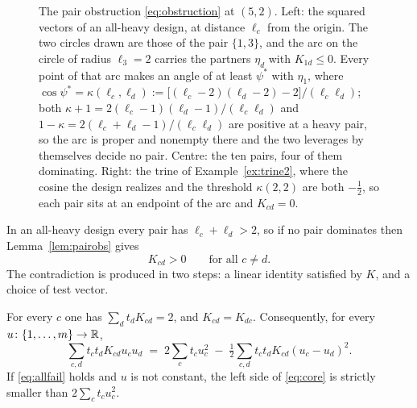 \begin{figure}[ht]
  \centering
  
  \caption{The pair obstruction \eqref{eq:obstruction} at $(5,2)$.  Left: the
  squared vectors of an all-heavy design, at distance $\ell_c$ from the
  origin.  The two circles drawn are those of the pair $\{1,3\}$, and the arc
  on the circle of radius $\ell_3=2$ carries the partners $\eta_d$ with
  $K_{1d}\le0$.  Every point of that arc makes an angle of at
  least $\psi^{*}$ with $\eta_1$, where $\cos\psi^{*}=\kappa(\ell_c,\ell_d):=
  \bigl[(\ell_c-2)(\ell_d-2)-2\bigr]/(\ell_c\ell_d)$; both
  $\kappa+1=2(\ell_c-1)(\ell_d-1)/(\ell_c\ell_d)$ and
  $1-\kappa=2(\ell_c+\ell_d-1)/(\ell_c\ell_d)$ are positive at a heavy pair,
  so the arc is proper and nonempty there and the two leverages by themselves
  decide no pair.  Centre: the ten pairs, four of them dominating.  Right: the
  trine of Example~\ref{ex:trine2}, where the cosine the design realizes and
  the threshold $\kappa(2,2)$ are both $-\tfrac12$, so each pair sits at an
  endpoint of the arc and $K_{cd}=0$.}
  \label{fig:obstruction}
\end{figure}

In an all-heavy design every pair has $\ell_c+\ell_d>2$, so if no pair
dominates then Lemma~\ref{lem:pairobs} gives
\begin{equation}\label{eq:allfail}
  K_{cd}>0\qquad\text{for all }c\ne d .
\end{equation}
The contradiction is produced in two steps: a linear identity satisfied
by $K$, and a choice of test vector.

\begin{lemma}\label{lem:rowsum}
For every $c$ one has $\sum_d t_dK_{cd}=2$, and $K_{cd}=K_{dc}$.
Consequently, for every $u\colon\{1,\dots,m\}\to\mathbb{R}$,
\begin{equation}\label{eq:core}
  \sum_{c,d}t_ct_dK_{cd}u_cu_d
  \;=\;2\sum_c t_cu_c^2
      \;-\;\tfrac12\sum_{c,d}t_ct_dK_{cd}(u_c-u_d)^2 .
\end{equation}
If \eqref{eq:allfail} holds and $u$ is not constant, the left side of
\eqref{eq:core} is strictly smaller than $2\sum_ct_cu_c^2$.
\end{lemma}

